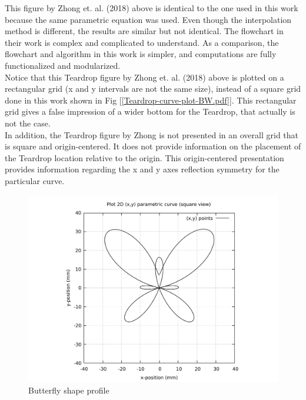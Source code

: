This figure by Zhong et. al. (2018) above is identical to the one used in this work because the same parametric equation was used. Even though the interpolation method is different, the results are similar but not identical. The flowchart in their work is complex and complicated to understand. As a comparison, the flowchart and algorithm in this work is simpler, and computations are fully functionalized and modularized.\\

Notice that this Teardrop figure by Zhong et. al. (2018) above is plotted on a rectangular grid (x and y intervals are not the same size), instead of a square grid done in this work shown in Fig [\ref{Teardrop-curve-plot-BW.pdf}]. This rectangular grid gives a false impression of a wider bottom for the Teardrop, that actually is not the case.\\ 

In addition, the Teardrop figure by Zhong is not presented in an overall grid that is square and origin-centered. It does not provide information on the placement of the Teardrop location relative to the origin. This origin-centered presentation provides information regarding the x and y axes reflection symmetry for the particular curve. \\



\clearpage
\pagebreak

\begin{figure}
	\caption{Butterfly shape profile}
	\label{Butterfly-curve-plot-BW.pdf}
	\centering
	\includegraphics[width=1.00\textwidth]{Chap3/curve-shape/curves/Butterfly-curve-plot-BW.pdf} 
\end{figure}

